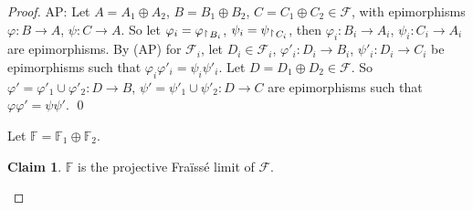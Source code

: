 \documentclass[12pt,twoside,a4paper]{amsart}
\theoremstyle{plain}
\theoremstyle{definition}
\newtheorem{claim}{Claim}[theorem]
\begin{document}
\begin{proof}
AP:
Let $A=A_1\oplus A_2$, $B=B_1\oplus B_2$, $C=C_1\oplus C_2\in \mathcal F $, with epimorphisms $ {\varphi} :B\to A$, $\psi :C\to A$.
So let $ {\varphi}_i= {\varphi} {\, _{{\begin{tikzpicture}[{}]\draw (0,-0.5pt) -- (0,5pt);\draw (0,5pt) -- (1.5pt,3.5pt);\end{tikzpicture}}\, {B_i}}} $, $\psi_i=\psi {\, _{{\begin{tikzpicture}[{}]\draw (0,-0.5pt) -- (0,5pt);\draw (0,5pt) -- (1.5pt,3.5pt);\end{tikzpicture}}\, {C_i}}} $, then $ {\varphi}_i:B_i\to A_i$, $\psi_i:C_i\to A_i$ are epimorphisms.
By (AP) for $ \mathcal F_i$, let $D_i \in \mathcal F_i$, $ {\varphi}'_i:D_i\to B_i$, $\psi'_i:D_i\to C_i$ be epimorphisms such that $ {\varphi}_i{\varphi}'_i=\psi_i\psi'_i$.
Let $D=D_1\oplus D_2\in \mathcal F $.
So $ {\varphi}'= {\varphi}'_1\cup {\varphi}'_2:D\to B$, $\psi'=\psi'_1\cup\psi'_2:D\to C$ are epimorphisms such that $ {\varphi} {\varphi}'=\psi\psi'$.
\qed

\medskip
Let $ \mathbb F = \mathbb F_1\oplus \mathbb F_2$.

\begin{claim}
$ \mathbb F $ is the projective Fra\"iss\'e limit of $ \mathcal F $.
\end{claim}


\end{proof}
\end{document}
